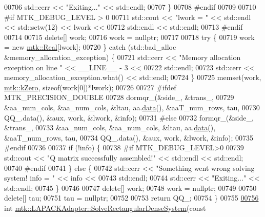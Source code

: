 \begin{DoxyCode}
00706     std::cerr << \textcolor{stringliteral}{"Exiting..."} << std::endl;
00707   \}
00708 \textcolor{preprocessor}{  #endif}
00709 
00710 \textcolor{preprocessor}{  #if MTK\_DEBUG\_LEVEL > 0}
00711   std::cout << \textcolor{stringliteral}{"lwork = "} << std::endl << std::setw(12) << lwork <<
00712     std::endl << std::endl;
00713 \textcolor{preprocessor}{  #endif}
00714 
00715   \textcolor{keyword}{delete}[] work;
00716   work = \textcolor{keyword}{nullptr};
00717 
00718   \textcolor{keywordflow}{try} \{
00719     work = \textcolor{keyword}{new} \hyperlink{group__c01-roots_gac080bbbf5cbb5502c9f00405f894857d}{mtk::Real}[lwork];
00720   \} \textcolor{keywordflow}{catch} (std::bad\_alloc &memory\_allocation\_exception) \{
00721     std::cerr << \textcolor{stringliteral}{"Memory allocation exception on line "} << \_\_LINE\_\_ - 3 <<
00722       std::endl;
00723     std::cerr << memory\_allocation\_exception.what() << std::endl;
00724   \}
00725   memset(work, \hyperlink{group__c01-roots_ga59a451a5fae30d59649bcda274fea271}{mtk::kZero}, \textcolor{keyword}{sizeof}(work[0])*lwork);
00726 
00727 \textcolor{preprocessor}{  #ifdef MTK\_PRECISION\_DOUBLE}
00728   dormqr\_(&side\_, &trans\_,
00729           &aa\_num\_cols, &aa\_num\_cols, &ltau, aa.\hyperlink{classmtk_1_1DenseMatrix_a0c33b8a9e01d157c61ddbdf807c25d84}{data}(), &aaT\_num\_rows, tau,
00730           QQ\_.data(), &aux, work, &lwork, &info);
00731 \textcolor{preprocessor}{  #else}
00732   formqr\_(&side\_, &trans\_,
00733           &aa\_num\_cols, &aa\_num\_cols, &ltau, aa.\hyperlink{classmtk_1_1DenseMatrix_a0c33b8a9e01d157c61ddbdf807c25d84}{data}(), &aaT\_num\_rows, tau,
00734           QQ\_.data(), &aux, work, &lwork, &info);
00735 \textcolor{preprocessor}{  #endif}
00736 
00737   \textcolor{keywordflow}{if} (!info) \{
00738 \textcolor{preprocessor}{    #if MTK\_DEBUG\_LEVEL>0}
00739     std::cout << \textcolor{stringliteral}{"Q matrix successfully assembled!"} << std::endl << std::endl;
00740 \textcolor{preprocessor}{    #endif}
00741   \} \textcolor{keywordflow}{else} \{
00742     std::cerr << \textcolor{stringliteral}{"Something went wrong solving system! info = "} << info <<
00743       std::endl;
00744     std::cerr << \textcolor{stringliteral}{"Exiting..."} << std::endl;
00745   \}
00746 
00747   \textcolor{keyword}{delete}[] work;
00748   work = \textcolor{keyword}{nullptr};
00749 
00750   \textcolor{keyword}{delete}[] tau;
00751   tau = \textcolor{keyword}{nullptr};
00752 
00753   \textcolor{keywordflow}{return} QQ\_;
00754 \}
00755 
\hypertarget{mtk__lapack__adapter_8cc_source_l00756}{}\hyperlink{classmtk_1_1LAPACKAdapter_a380f148ffdf96bae2f79ae28f1a6560c}{00756} \textcolor{keywordtype}{int} \hyperlink{classmtk_1_1LAPACKAdapter_a380f148ffdf96bae2f79ae28f1a6560c}{mtk::LAPACKAdapter::SolveRectangularDenseSystem}(\textcolor{keyword}{const} 

\end{DoxyCode}
